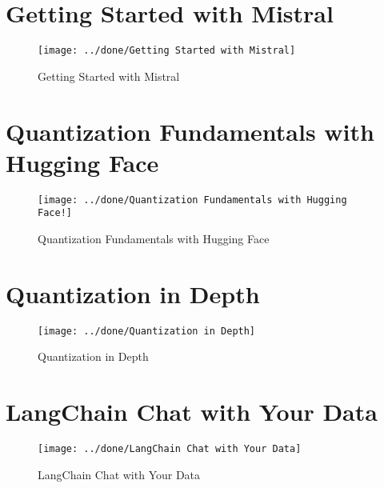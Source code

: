 \documentclass[a4paper,12pt]{article}
\begin{document}
\section*{Getting Started with Mistral}
\begin{figure}[h]
	\centering
	\vspace{-10pt} %
	\texttt{[image: ../done/Getting Started with Mistral]}
	\vspace{-10pt} %
	\caption{Getting Started with Mistral}
	\vspace{-10pt} %
\end{figure}


\section*{Quantization Fundamentals with Hugging Face}
\begin{figure}[h]
	\centering
	\vspace{-10pt} %
	\texttt{[image: ../done/Quantization Fundamentals with Hugging Face!]}
	\vspace{-10pt} %
	\caption{Quantization Fundamentals with Hugging Face}
	\vspace{-10pt} %
\end{figure}
\newpage
\section*{Quantization in Depth}
\begin{figure}[h]
	\centering
	\vspace{-10pt} %
	\texttt{[image: ../done/Quantization in Depth]}
	\vspace{-10pt} %
	\caption{Quantization in Depth}
	\vspace{-10pt} %
\end{figure}


\section*{LangChain Chat with Your Data}
\begin{figure}[h]
	\centering
	\vspace{-10pt} %
	\texttt{[image: ../done/LangChain Chat with Your Data]}
	\vspace{-10pt} %
	\caption{LangChain Chat with Your Data}
	\vspace{-10pt} %
\end{figure}
\newpage
\end{document}
